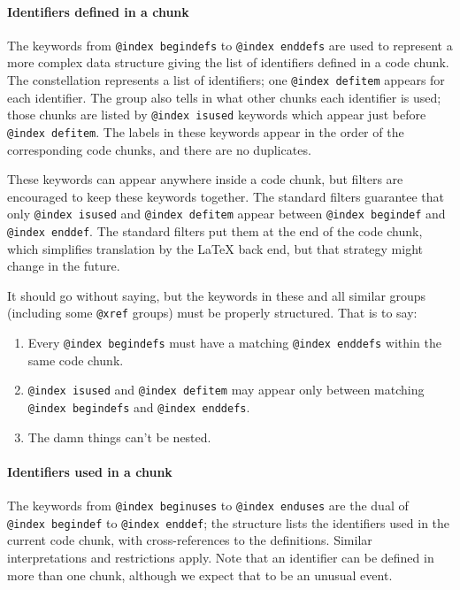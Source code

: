 \documentclass{article}
\makeatletter
\newcommand\kw[1]{\texttt{@#1}}
\newcommand\ikw[1]{\kw{index~#1}}
\makeatother
\begin{document}
\paragraph{Identifiers defined in a chunk}

The keywords from \ikw{begindefs} to \ikw{enddefs} are used to represent
a more complex data structure giving the list of identifiers defined
in a code chunk.
The constellation represents a list of identifiers; one \ikw{defitem}
appears for each identifier.
The group also tells in what other chunks each identifier is used;
those chunks are listed by \ikw{isused} keywords which appear just
before \ikw{defitem}.
The labels in these keywords appear in the order of the corresponding
code chunks, and there are no duplicates.

These keywords can appear anywhere inside a code chunk, but
filters are encouraged to keep these keywords together.
The standard
filters guarantee that only
\ikw{isused} and \ikw{defitem} appear between \ikw{begindef} and
\ikw{enddef}.
The standard filters put them at the end of the code chunk, which
simplifies translation by the {\LaTeX} back end, but that strategy
might change in the future.


It should go without saying, but the keywords in these and all similar
groups (including some \kw{xref} groups) must be properly structured.
That is to say:
\begin{enumerate}
\item
Every \ikw{begindefs} must have a matching \ikw{enddefs} within the
same code chunk.
\item
\ikw{isused} and \ikw{defitem} may appear only between matching
\ikw{begindefs} and \ikw{enddefs}.
\item
The damn things can't be nested.
\end{enumerate}


\paragraph{Identifiers used in a chunk}


The keywords from \ikw{beginuses} to \ikw{enduses} are the dual of
\ikw{begindef} to \ikw{enddef};
the structure lists the identifiers used in the current code chunk,
with cross-references to the definitions.
Similar interpretations and restrictions apply.
Note that an identifier can be defined in more than one chunk,
although we expect that to be an unusual event.
{\hfuzz=1.2pt\par}
\end{document}
